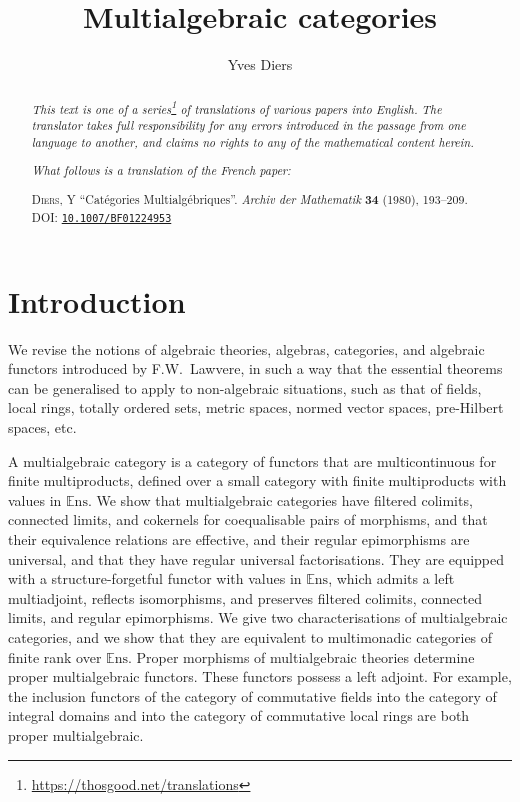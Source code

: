\documentclass{article}
\title{Multialgebraic categories}
\author{Yves Diers}
\date{}
\newcommand{\doctype}{French paper}
\newcommand{\origcit}{%
  \textsc{Diers, Y}
  ``Cat\'{e}gories Multialg\'{e}briques''.
  \emph{Archiv der Mathematik} \textbf{34} (1980), 193--209.
  DOI: \href{https://doi.org/10.1007/BF01224953}{\texttt{10.1007/BF01224953}}%
}
\newcommand{\Set}{\mathbb{E}\mathrm{ns}}
\newcommand{\oldpage}[1]{\marginpar{\footnotesize$\Big\vert$ \textit{p.~#1}}}
\begin{document}
\maketitle
\thispagestyle{fancy}

\renewcommand{\abstractname}{Translator's note.}

\begin{abstract}
  \renewcommand*{\thefootnote}{\fnsymbol{footnote}}
  \emph{This text is one of a series\footnote{\url{https://thosgood.net/translations}} of translations of various papers into English.}
  \emph{The translator takes full responsibility for any errors introduced in the passage from one language to another, and claims no rights to any of the mathematical content herein.}

  \medskip
  
  \emph{What follows is a translation of the \doctype:}

  \medskip\noindent
  \origcit
\end{abstract}

\setcounter{footnote}{0}
\setcounter{section}{-1}

\setcounter{tocdepth}{1}
\tableofcontents
\bigskip



\section{Introduction}
\label{0}

\oldpage{193}
We revise the notions of algebraic theories, algebras, categories, and algebraic functors introduced by F.W.~Lawvere, in such a way that the essential theorems can be generalised to apply to non-algebraic situations, such as that of fields, local rings, totally ordered sets, metric spaces, normed vector spaces, pre-Hilbert spaces, etc.

A multialgebraic category is a category of functors that are multicontinuous for finite multiproducts, defined over a small category with finite multiproducts with values in $\Set$.
We show that multialgebraic categories have filtered colimits, connected limits, and cokernels for coequalisable pairs of morphisms, and that their equivalence relations are effective, and their regular epimorphisms are universal, and that they have regular universal factorisations.
They are equipped with a structure-forgetful functor with values in $\Set$, which admits a left multiadjoint, reflects isomorphisms, and preserves filtered colimits, connected limits, and regular epimorphisms.
We give two characterisations of multialgebraic categories, and we show that they are equivalent to multimonadic categories of finite rank over $\Set$.
Proper morphisms of multialgebraic theories determine proper multialgebraic functors.
These functors possess a left adjoint.
For example, the inclusion functors of the category of commutative fields into the category of integral domains and into the category of commutative local rings are both proper multialgebraic.
\end{document}
